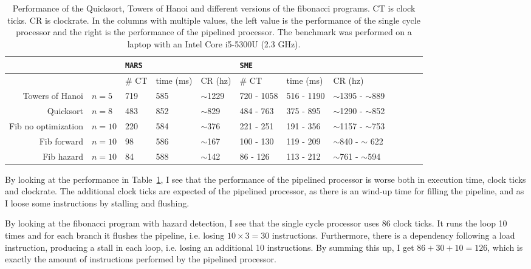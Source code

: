 \begin{table}
    \centering
    \begin{adjustbox}{center}
    \begin{tabular}{rlllllllllll}
        & & \texttt{MARS} & & & \texttt{SME} \\
        \hline
        & & \# CT & time (ms) & CR (hz) &
            \# CT & time (ms) & CR (hz) \\
        \hline
        Towers of Hanoi & $n=5$ &
            719        & 585        & $\sim$1229 &
            720 - 1058 & 516 - 1190 & $\sim$1395 - $\sim$889 \\

        Quicksort & $n=8$ &
            483       & 852       & $\sim$829 &
            484 - 763 & 375 - 895 & $\sim$1290 - $\sim$852 \\

        Fib no optimization & $n=10$ &
            220       & 584       & $\sim$376 &
            221 - 251 & 191 - 356 & $\sim$1157 - $\sim$753 \\

        Fib forward & $n=10$ &
            98        & 586       & $\sim$167 &
            100 - 130 & 119 - 209 & $\sim$840 - $\sim$ 622 \\

        Fib hazard & $n=10$ &
            84       & 588       & $\sim$142 &
            86 - 126 & 113 - 212 & $\sim$761 - $\sim$594 \\
        \hline
    \end{tabular}
    \end{adjustbox}
    \caption{Performance of the Quicksort, Towers of Hanoi and different
    versions of the fibonacci programs. CT is clock ticks. CR is clockrate.
    In the columns with multiple values, the left value is the performance of
    the single cycle processor and the right is the performance of the pipelined
    processor. The benchmark was performed on a laptop with an Intel Core
    i5-5300U (2.3 GHz).}
    \label{tab:perf-pipe}
\end{table}


By looking at the performance in Table~\ref{tab:perf-pipe}, I see that the
performance of the pipelined processor is worse both in execution time, clock
ticks and clockrate. The additional clock ticks are expected of the pipelined
processor, as there is an wind-up time for filling the pipeline, and as I loose
some instructions by stalling and flushing.

By looking at the fibonacci program with hazard detection, I see that the
single cycle processor uses 86 clock ticks. It runs the loop 10 times and for
each branch it flushes the pipeline, i.e. losing $10 \times 3 = 30$
instructions. Furthermore, there is a dependency following a load instruction,
producing a stall in each loop, i.e. losing an additional 10 instructions. By
summing this up, I get $86 + 30 + 10 = 126$, which is exactly the
amount of instructions performed by the pipelined processor.


